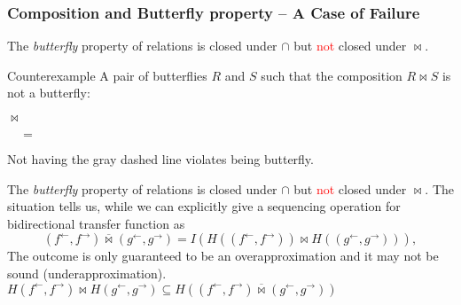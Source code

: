 \documentclass{beamer}
\newcommand{\ff}{{f^{\rightarrow}}}
\newcommand{\fb}{{f^{\leftarrow}}}
\newcommand{\gf}{{g^{\rightarrow}}}
\newcommand{\gb}{{g^{\leftarrow}}}
\newcommand{\bowtielift}{\mathbin{\overline{\bowtie}}}
\newcommand{\rotleq}{\rotatebox[origin=c]{90}{$\leq$}}
\newcommand{\red}[1]{\textcolor{red}{#1}}
\begin{document}
\begin{frame} [fragile]
  \frametitle{Composition and Butterfly property -- A Case of Failure}
  The \emph{butterfly} property of relations is closed under $\cap$ but \red{not} closed under $\bowtie$.
  \begin{block}{Counterexample}
  A pair of butterflies $R$ and $S$ such that the composition $R \bowtie S$ is not a butterfly:
  \begin{center}
    $\bowtie$
    $\quad=\quad$
  \end{center}
  Not having the gray dashed line violates being butterfly.
  \end{block}
\end{frame}

\begin{frame}
  The \emph{butterfly} property of relations is closed under $\cap$ but \red{not} closed under $\bowtie$.
  The situation tells us, while we can explicitly give a sequencing operation for bidirectional transfer function as
  \begin{equation*}
    (\fb,\ff) \bowtielift (\gb,\gf) = I(H((\fb, \ff)) \bowtie H((\gb , \gf))),
  \end{equation*}
  The outcome is only guaranteed to be an overapproximation and it may not be sound (underapproximation).
  $H(\fb, \ff) \bowtie H(\gb, \gf) \subseteq H((\fb, \ff) \bowtielift (\gb, \gf))$
\end{frame}
\end{document}
